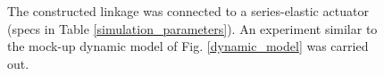 \documentclass[journal]{IEEEtran}
\begin{document}
\begin{figure}[!t]
\centering
{}
\hfil
{}
\caption{The constructed linkage was connected to a series-elastic actuator (specs in Table \ref{simulation_parameters}).  An experiment similar to the mock-up dynamic model of Fig. \ref{dynamic_model} was carried out.}
\label{prototype_experiment}
\end{figure}
\end{document}
